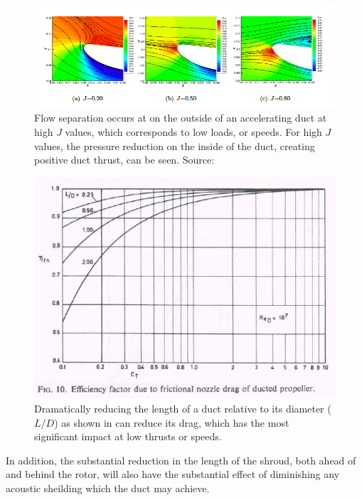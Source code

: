 \documentclass{article}\usepackage[]{graphicx}\usepackage[]{color}
\begin{document}
\begin{figure}
\includegraphics[width=\textwidth]{DuctSeparation.png}
\caption{Flow separation occurs at on the outside of an accelerating duct at high $J$ values, which corresponds to low loads, or speeds. For high $J$ values, the pressure reduction on the inside of the duct, creating positive duct thrust, can be seen. Source: \cite[73]{willemsen2013}}
\label{fig:DuctSeparation.png}
\end{figure}

\begin{figure}
\includegraphics[width=\textwidth]{NozzleDrag.png}
\caption{Dramatically reducing the length of a duct relative to its diameter ($L/D$) as shown in \cite{oosterveld1970} can reduce its drag, which has the most significant impact at low thrusts or speeds.}
\label{fig:NozzleDrag.png}
\end{figure}

In addition, the substantial reduction in the length of the shroud, both ahead of and behind the rotor, will also have the substantial effect of diminishing any acoustic sheilding which the duct may achieve.
\end{document}
